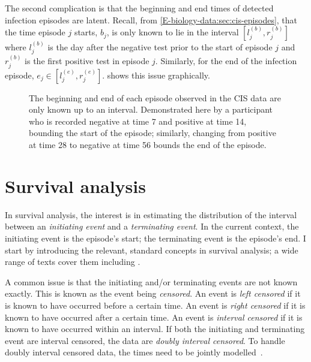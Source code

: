 \documentclass[thesis.tex]{subfiles}
\begin{document}
The second complication is that the beginning and end times of detected infection episodes are latent.
Recall, from \cref{E-biology-data:sec:cis-episodes}, that the time episode $j$ starts, $b_j$, is only known to lie in the interval $[l_j^{(b)}, r_j^{(b)}]$ where $l_j^{(b)}$ is the day after the negative test prior to the start of episode $j$ and $r_j^{(b)}$ is the first positive test in episode $j$.
Similarly, for the end of the infection episode, $e_j \in [l_j^{(e)}, r_j^{(e)}]$.
 shows this issue graphically.
\begin{figure}
  \caption[Double-interval censoring in CIS data]{%
        The beginning and end of each episode observed in the CIS data are only known up to an interval.
        Demonstrated here by a participant who is recorded negative at time 7 and positive at time 14, bounding the start of the episode; similarly, changing from positive at time 28 to negative at time 56 bounds the end of the episode.
    }
    \label{perf-test:fig:double-interval-censor}
\end{figure}

\section{Survival analysis} \label{perf-test:sec:surv-analysis}

In survival analysis, the interest is in estimating the distribution of the interval between an \emph{initiating event} and a \emph{terminating event}.
In the current context, the initiating event is the episode's start; the terminating event is the episode's end.
I start by introducing the relevant, standard concepts in survival analysis; a wide range of texts cover them including \textcite[chapter 1]{bogaertsSurvival}.

A common issue is that the initiating and/or terminating events are not known exactly.
This is known as the event being \emph{censored}.
An event is \emph{left censored} if it is known to have occurred before a certain time.
An event is \emph{right censored} if it is known to have occurred after a certain time.
An event is \emph{interval censored} if it is known to have occurred within an interval.
If both the initiating and terminating event are interval censored, the data are \emph{doubly interval censored}.
To handle doubly interval censored data, the times need to be jointly modelled~\autocite[and references therein]{liSemiparametric}.
\end{document}

